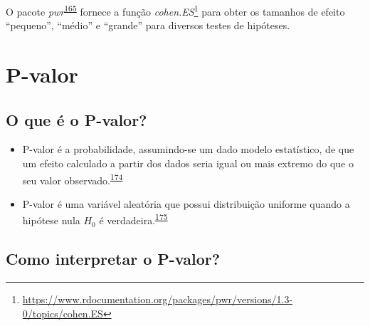 \documentclass[
  a4paper,
]{book}
\renewcommand{\href}[2]{#2\footnote{\url{#1}}}
\newenvironment{infobox}[1]
  {
  \begin{itemize}
  \renewcommand{\labelitemi}{
    \raisebox{-.7\height}[0pt][0pt]{
      {\setkeys{Gin}{width=3em,keepaspectratio}
        \texttt{[image: \#1]}}
    }
  }
  \setlength{\fboxsep}{1em}
  \begin{blackbox}
  \item
  }
  {
  \end{blackbox}
  \end{itemize}
  }
\begin{document}
\begin{infobox}{images/Rlogo}
O pacote \emph{pwr}\textsuperscript{\protect\hyperlink{ref-pwr}{165}} fornece a função \href{https://www.rdocumentation.org/packages/pwr/versions/1.3-0/topics/cohen.ES}{\emph{cohen.ES}} para obter os tamanhos de efeito ``pequeno'', ``médio'' e ``grande'' para diversos testes de hipóteses.

\end{infobox}

\hypertarget{p-valor}{%
\section{P-valor}\label{p-valor}}

\hypertarget{o-que-uxe9-o-p-valor}{%
\subsection{O que é o P-valor?}\label{o-que-uxe9-o-p-valor}}

\begin{itemize}
\item
  P-valor é a probabilidade, assumindo-se um dado modelo estatístico, de que um efeito calculado a partir dos dados seria igual ou mais extremo do que o seu valor observado.\textsuperscript{\protect\hyperlink{ref-wasserstein2016}{174}}
\item
  P-valor é uma variável aleatória que possui distribuição uniforme quando a hipótese nula \(H_{0}\) é verdadeira.\textsuperscript{\protect\hyperlink{ref-altman2017}{175}}
\end{itemize}

\hypertarget{como-interpretar-o-p-valor}{%
\subsection{Como interpretar o P-valor?}\label{como-interpretar-o-p-valor}}
\end{document}
